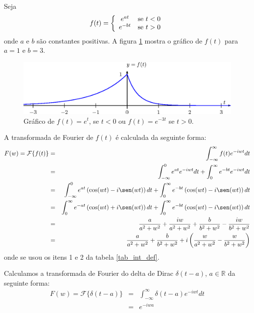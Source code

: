 \begin{ex} Seja 
\begin{equation}f(t)=\left\{\begin{array}{cc}e^{at}&\hbox{se}\ t<0\\
e^{-bt}&\hbox{se}\ t>0
\end{array}\right.
\end{equation}
onde $a$ e $b$ são constantes positivas. A figura \ref{fig_trans_1} mostra o gráfico de $f(t)$ para $a=1$ e $b=3$.
\begin{figure}[!ht]
\begin{center}
\includegraphics{cap_transformada_de_fourier/pics/figura_7}
\end{center}
\caption{\label{fig_trans_1} Gráfico de $f(t)=e^{t}$, se $t<0$ ou $f(t)=e^{-3t}$ se $t>0$.  }
\end{figure}
A transformada de Fourier de $f(t)$ é calculada da seguinte forma:
\begin{eqnarray*}
F(w)=\mathcal{F}\{f(t)\}&=&\int_{-\infty}^\infty f(t) e^{-i w t}dt\\
&=&\int_{-\infty}^0 e^{at} e^{-i w t}dt+\int_{0}^\infty e^{-bt} e^{-i w t}dt\\
&=&\int_{-\infty}^0 e^{at} \left(\cos(wt)-i\sen(wt)\right)dt+\int_{0}^\infty e^{-bt} \left(\cos(wt)-i\sen(wt)\right)dt\\
&=&\int_{0}^\infty e^{-at} \left(\cos(wt)+i\sen(wt)\right)dt+\int_{0}^\infty e^{-bt} \left(\cos(wt)-i\sen(wt)\right)dt\\
&=&\frac{a}{a^2+w^2}+\frac{iw}{a^2+w^2}+\frac{b}{b^2+w^2}-\frac{iw}{b^2+w^2}\\
&=&\frac{a}{a^2+w^2}+\frac{b}{b^2+w^2}+i\left(\frac{w}{a^2+w^2}-\frac{w}{b^2+w^2}\right)
\end{eqnarray*}
onde se usou os itens 1 e 2 da tabela \ref{tab_int_def}.
\end{ex}
\begin{ex} Calculamos a transformada de Fourier do delta de Dirac $\delta(t-a)$, $a\in\mathbb{R}$ da seguinte forma:
\begin{eqnarray*}
F(w)=\mathcal{F}\{\delta(t-a)\}&=&\int_{-\infty}^\infty \delta(t-a) e^{-i w t}dt\\
&=&e^{-i w a}
\end{eqnarray*}
\end{ex}
